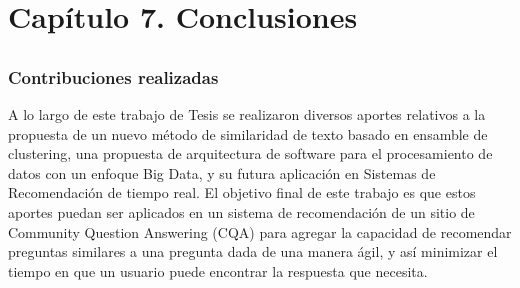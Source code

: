 \chapter*{Capítulo 7. \textbf{Conclusiones}}\label{ch:conclusiones}

\section*{}
\addtocounter{section}{1}
\setcounter{subsection}{0}

\subsection{Contribuciones realizadas}
A lo largo de este trabajo de Tesis se realizaron diversos aportes relativos a la propuesta de un nuevo método de similaridad de texto basado en ensamble de clustering, una propuesta de arquitectura de software para el procesamiento de datos con un enfoque Big Data, y su futura aplicación en Sistemas de Recomendación de tiempo real. El objetivo final de este trabajo es que estos aportes puedan ser aplicados en un sistema de recomendación de un sitio de Community Question Answering (CQA) para agregar la capacidad de recomendar preguntas similares a una pregunta dada de una manera ágil, y así minimizar el tiempo en que un usuario puede encontrar la respuesta que necesita.

